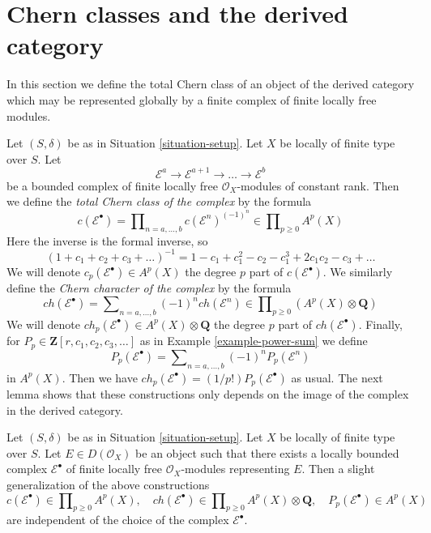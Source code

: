 \section{Chern classes and the derived category}
\label{section-pre-derived}

\noindent
In this section we define the total Chern class of an object
of the derived category which may be represented globally
by a finite complex of finite locally free modules.

\medskip\noindent
Let $(S, \delta)$ be as in Situation \ref{situation-setup}.
Let $X$ be locally of finite type over $S$. Let
$$
\mathcal{E}^a \to \mathcal{E}^{a + 1} \to \ldots \to \mathcal{E}^b
$$
be a bounded complex of finite locally free $\mathcal{O}_X$-modules
of constant rank.
Then we define the {\it total Chern class of the complex} by the formula
$$
c(\mathcal{E}^\bullet) = \prod\nolimits_{n = a, \ldots, b}
c(\mathcal{E}^n)^{(-1)^n} \in \prod\nolimits_{p \geq 0} A^p(X)
$$
Here the inverse is the formal inverse, so
$$
(1 + c_1 + c_2 + c_3 + \ldots)^{-1} =
1 - c_1 + c_1^2 - c_2 - c_1^3 + 2c_1 c_2 - c_3 + \ldots
$$
We will denote $c_p(\mathcal{E}^\bullet) \in A^p(X)$
the degree $p$ part of $c(\mathcal{E}^\bullet)$.
We similarly define the {\it Chern character of the complex} by
the formula
$$
ch(\mathcal{E}^\bullet) = \sum\nolimits_{n = a, \ldots, b}
(-1)^n ch(\mathcal{E}^n) \in
\prod\nolimits_{p \geq 0} (A^p(X) \otimes \mathbf{Q})
$$
We will denote $ch_p(\mathcal{E}^\bullet) \in A^p(X) \otimes \mathbf{Q}$
the degree $p$ part of $ch(\mathcal{E}^\bullet)$.
Finally, for $P_p \in \mathbf{Z}[r, c_1, c_2, c_3, \ldots]$
as in Example \ref{example-power-sum} we define
$$
P_p(\mathcal{E}^\bullet) = \sum\nolimits_{n = a, \ldots, b}
(-1)^n P_p(\mathcal{E}^n)
$$
in $A^p(X)$. Then we have
$ch_p(\mathcal{E}^\bullet) = (1/p!)P_p(\mathcal{E}^\bullet)$
as usual. The next lemma shows that these constructions only depends
on the image of the complex in the derived category.

\begin{lemma}
\label{lemma-pre-derived-chern-class}
Let $(S, \delta)$ be as in Situation \ref{situation-setup}.
Let $X$ be locally of finite type over $S$. Let $E \in D(\mathcal{O}_X)$
be an object such that there exists a locally bounded complex
$\mathcal{E}^\bullet$ of finite locally free $\mathcal{O}_X$-modules
representing $E$. Then a slight generalization of the above constructions
$$
c(\mathcal{E}^\bullet) \in \prod\nolimits_{p \geq 0} A^p(X),\quad
ch(\mathcal{E}^\bullet) \in
\prod\nolimits_{p \geq 0} A^p(X) \otimes \mathbf{Q},\quad
P_p(\mathcal{E}^\bullet) \in A^p(X)
$$
are independent of the choice of the complex $\mathcal{E}^\bullet$.
\end{lemma}

